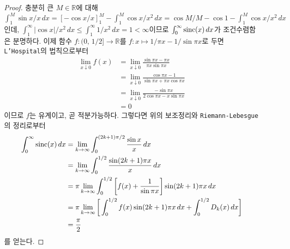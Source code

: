 \begin{proof}
    충분히 큰 $M\in\mathbb{R}$에 대해 $\int_1^M\sin x/x\,dx=[-\cos x/x]_1^M-\int_1^M\cos x/x^2\,dx=\cos M/M-\cos 1-\int_1^M\cos x/x^2\,dx$인데, $\int_1^\infty|\cos x|/x^2\,dx\leq\int_1^\infty1/x^2\,dx=1<\infty$이므로 $\int_0^\infty\mathrm{sinc}(x)\,dx$가 조건수렴함은 분명하다. 이제 함수 $f:(0,\,1/2]\to\mathbb{R}$를 $f:x\mapsto1/\pi x-1/\sin\pi x$로 두면 \texttt{L'Hospital}의 법칙으로부터
    \begin{align*}
        \lim_{x\downarrow0}f(x)&=\lim_{x\downarrow0}\frac{\sin\pi x-\pi x}{\pi x\sin \pi x}\\
        &=\lim_{x\downarrow0}\frac{\cos\pi x-1}{\sin\pi x+\pi x\cos\pi x}\\
        &=\lim_{x\downarrow0}\frac{-\sin\pi x}{2\cos\pi x-x\sin\pi x}\\
        &=0
    \end{align*}
    이므로 $f$는 유계이고, 곧 적분가능하다. 그렇다면 위의 보조정리와 \texttt{Riemann-Lebesgue}의 정리로부터
    \begin{align*}
        \int_0^\infty\mathrm{sinc}(x)\,dx&=\lim_{k\to\infty}\int_0^{(2k+1)\pi/2}\frac{\sin x}{x}\,dx\\
        &=\lim_{k\to\infty}\int_0^{1/2}\frac{\sin(2k+1)\pi x}{x}\,dx\\
        &=\pi\lim_{k\to\infty}\int_0^{1/2}\bigg[f(x)+\frac{1}{\sin\pi x}\bigg]\sin(2k+1)\pi x\,dx\\
        &=\pi\lim_{k\to\infty}\bigg[\int_0^{1/2}f(x)\sin(2k+1)\pi x\,dx+\int_0^{1/2}D_k(x)\,dx\bigg]\\
        &=\frac{\pi}{2}
    \end{align*}
    를 얻는다.
\end{proof}

